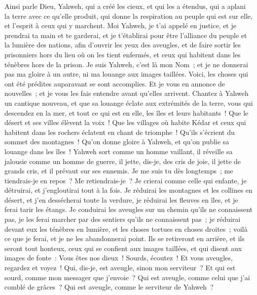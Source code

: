 \begin{multicols}{2}
Ainsi parle Dieu, Yahweh, qui a créé les cieux, et qui les a étendus, qui a aplani la terre avec ce qu'elle produit, qui donne la respiration au peuple qui est sur elle, et l'esprit à ceux qui y marchent.
Moi Yahweh, je t'ai appelé en justice, et je prendrai ta main et te garderai, et je t'établirai pour être l'alliance du peuple et la lumière des nations,
afin d'ouvrir les yeux des aveugles, et de faire sortir les prisonniers hors du lieu où on les tient enfermés, et ceux qui habitent dans les ténèbres hors de la prison.
Je suis Yahweh, c'est là mon Nom~; et je ne donnerai pas ma gloire à un autre, ni ma louange aux images taillées.
Voici, les choses qui ont été prédites auparavant se sont accomplies. Et je vous en annonce de nouvelles~; et je vous les fais entendre avant qu'elles arrivent.
Chantez à Yahweh un cantique nouveau, et que sa louange éclate aux extrémités de la terre, vous qui descendez en la mer, et tout ce qui est en elle, les îles et leurs habitants~!
Que le désert et ses villes élèvent la voix~! Que les villages où habite Kédar et ceux qui habitent dans les rochers éclatent en chant de triomphe~! Qu'ils s'écrient du sommet des montagnes~!
Qu'on donne gloire à Yahweh, et qu'on publie sa louange dans les îles~!
Yahweh sort comme un homme vaillant, il réveille sa jalousie comme un homme de guerre, il jette, dis-je, des cris de joie, il jette de grands cris, et il prévaut sur ses ennemis.
Je me suis tu dès longtemps~; me tiendrais-je en repos~? Me retiendrais-je~? Je crierai comme celle qui enfante, je détruirai, et j'engloutirai tout à la fois.
Je réduirai les montagnes et les collines en désert, et j'en dessécherai toute la verdure, je réduirai les fleuves en îles, et je ferai tarir les étangs.
Je conduirai les aveugles sur un chemin qu'ils ne connaissent pas, je les ferai marcher par des sentiers qu'ils ne connaissent pas~; je réduirai devant eux les ténèbres en lumière, et les choses tortues en choses droites~; voilà ce que je ferai, et je ne les abandonnerai point.
Ils se retireront en arrière, et ils seront tout honteux, ceux qui se confient aux images taillées, et qui disent aux images de fonte~: Vous êtes nos dieux~!
Sourds, écoutez~! Et vous aveugles, regardez et voyez~!
Qui, dis-je, est aveugle, sinon mon serviteur~? Et qui est sourd, comme mon messager que j'envoie~? Qui est aveugle, comme celui que j'ai comblé de grâces~? Qui est aveugle, comme le serviteur de Yahweh~?

\end{multicols}
